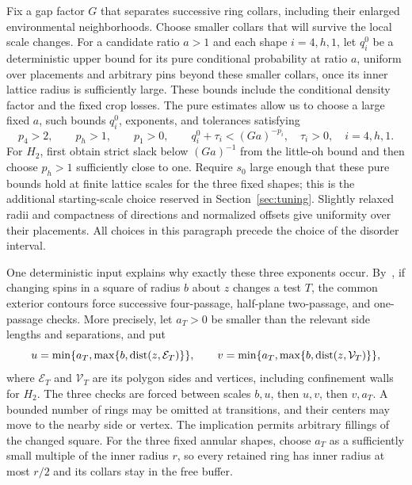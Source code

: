 Fix a gap factor $G$ that separates successive ring collars, including
their enlarged environmental neighborhoods.  Choose smaller collars
that will survive the local scale changes.  For a candidate ratio $a>1$
and each shape $i=4,h,1$,
let $q_i^0$ be a deterministic upper bound for its pure conditional
probability at ratio $a$, uniform over placements and arbitrary pins
beyond these smaller collars, once its inner lattice radius is
sufficiently large.  These bounds include the conditional density factor
and the fixed crop losses.  The pure estimates allow us to choose a
large fixed $a$, such bounds $q_i^0$, exponents, and tolerances satisfying
\begin{equation}
 p_4>2,\qquad p_h>1,\qquad p_1>0,\qquad
 q_i^0+\tau_i<(Ga)^{-p_i},\quad \tau_i>0,\quad i=4,h,1.
 \label{eq:crossing-slack}
\end{equation}
For $H_2$, first obtain strict slack below $(Ga)^{-1}$ from the little-oh
bound and then choose $p_h>1$ sufficiently close to one.  Require $s_0$
large enough that these pure bounds hold at finite lattice scales for
the three fixed shapes; this is the additional starting-scale choice
reserved in Section~\ref{sec:tuning}.  Slightly relaxed radii and compactness of directions and
normalized offsets give uniformity over their placements.  All choices
in this paragraph precede the choice of the disorder interval.

One deterministic input explains why exactly these three exponents
occur.  By~\cite[Section~5, ``Passages forced by a pivotal square'']{S},
if changing spins in a square of radius $b$ about $z$ changes a test $T$,
the common exterior contours force successive four-passage, half-plane
two-passage, and one-passage checks.  More precisely, let $a_T>0$ be
smaller than the relevant side lengths and separations, and put
\begin{equation}
 u=\min\{a_T,\max\{b,\operatorname{dist}(z,\mathcal E_T)\}\},\qquad
 v=\min\{a_T,\max\{b,\operatorname{dist}(z,\mathcal V_T)\}\},
 \label{eq:crossing-pivotal-distances}
\end{equation}
where $\mathcal E_T$ and $\mathcal V_T$ are its polygon sides and
vertices, including confinement walls for $H_2$.  The three checks
are forced between scales $b,u$, then $u,v$, then $v,a_T$.
A bounded number of rings may be omitted at transitions, and their
centers may move to the nearby side or vertex.  The implication permits
arbitrary fillings of the changed square.  For the three fixed annular
shapes, choose $a_T$ as a sufficiently small multiple of the inner
radius $r$, so every retained ring has inner radius at most $r/2$ and
its collars stay in the free buffer.

